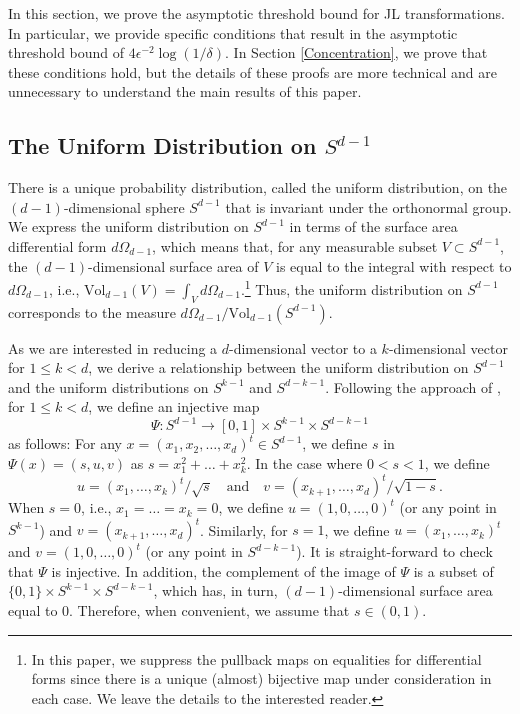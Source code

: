 \documentclass[twoside,11pt]{article}
\newcommand{\VV}[2]{\text{Vol}_{#2}\left( #1 \right)}
\begin{document}
In this section, we prove the asymptotic threshold bound for JL transformations.  In particular, we provide specific conditions that result in the asymptotic threshold bound of $4\epsilon^{-2}\log(1/\delta)$.  In Section \ref{Concentration}, we prove that these conditions hold, but the details of these proofs are more technical and are unnecessary to understand the main results of this paper.


\subsection{The Uniform Distribution on \texorpdfstring{$S^{d-1}$}{S(d-1)}}

There is a unique probability distribution, called the uniform distribution, on the $(d-1)$-dimensional sphere $S^{d-1}$ that is invariant under the orthonormal group.  We express the uniform distribution on $S^{d-1}$  in terms of the surface area differential form $d \Omega_{d-1}$, which means that, for any measurable subset 
$V \subset S^{d-1}$,  the $(d-1)$-dimensional surface area of $V$ is equal to the integral with respect to $d\Omega_{d-1}$, i.e., $\VV{V}{d-1}=\int_V  d \Omega_{d-1}$.\footnote{In this paper, we suppress the pullback maps on equalities for differential forms since there is a unique (almost) bijective map under consideration in each case.  We leave the details to the interested reader.}   Thus, the uniform distribution on $S^{d-1}$  corresponds to the measure $d \Omega_{d-1}/\VV{S^{d-1}}{d-1}$. 

As we are interested in reducing a $d$-dimensional vector to a $k$-dimensional vector for $1 \leq  k < d$,  we derive a relationship between the  uniform distribution  on 
 $S^{d-1}$ and the uniform distributions on $S^{k-1}$ and $S^{d-k-1}$.  Following the approach of  \cite{KaneNelsonMeka}, for $1\leq k<d$, we define an injective map 
\[ \Psi:   S^{d-1}   \rightarrow    [0,1] \times S^{k-1} \times S^{d-k-1} \]
 as follows:  
 For any  $x= (x_1,x_2, \ldots, x_d)^t \in S^{d-1}$, we define $s$ in $\Psi(x) = (s, u , v)$ as $s=x_1^2+\dots+x_k^2$.  In the case where $0<s<1$, we define 
  \[  u =  (x_1,  \ldots, x_k)^t/\sqrt{s} \quad\text{and}\quad   v = (x_{k+1}, \ldots, x_d)^t/\sqrt{1-s}.\]
When $s=0$, i.e., $x_1=\dots=x_k=0$, we define $u=(1,0, \ldots, 0)^t$  (or any point in $S^{k-1}$) and $v = (x_{k+1}, \ldots, x_d)^t$.  
 Similarly, for $s=1$, we define $u=(x_1, \ldots, x_k)^t$ and $v=(1,0, \ldots, 0)^t$ (or any point in $S^{d-k-1}$). 
 It is straight-forward to check that $\Psi$ is injective.  In addition, the complement of the image of $\Psi$ is a subset of $\{0,1\} \times S^{k-1} \times S^{d-k-1}$, which has, in turn, $(d-1)$-dimensional surface area equal to $0$.  Therefore, when convenient, we assume that $s\in(0,1)$.
 
\end{document}
